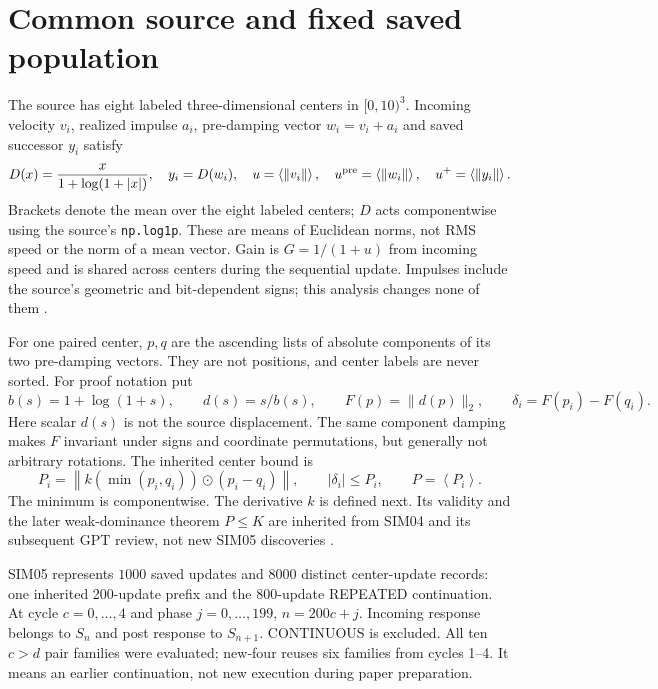 \documentclass[11pt,a4paper]{article}
\newcommand{\avg}[1]{\left\langle #1\right\rangle}
\begin{document}
\clearpage
\section{Common source and fixed saved population}\label{sec:setup}
The source has eight labeled three-dimensional centers in $[0,10)^3$. Incoming velocity $v_i$, realized impulse $a_i$, pre-damping vector $w_i=v_i+a_i$ and saved successor $y_i$ satisfy
\begin{equation}\label{eq:source}
D(x)=\frac{x}{1+\log(1+|x|)},\quad y_i=D(w_i),\quad
u=\avg{\|v_i\|},\quad u^{\rm pre}=\avg{\|w_i\|},\quad u^+=\avg{\|y_i\|}.
\end{equation}
Brackets denote the mean over the eight labeled centers; $D$ acts componentwise using the source's \texttt{np.log1p}. These are means of Euclidean norms, not RMS speed or the norm of a mean vector. Gain is $G=1/(1+u)$ from incoming speed and is shared across centers during the sequential update. Impulses include the source's geometric and bit-dependent signs; this analysis changes none of them \cite{upstream}.

For one paired center, $p,q$ are the ascending lists of absolute components of its two pre-damping vectors. They are not positions, and center labels are never sorted. For proof notation put
\begin{equation}\label{eq:F}
b(s)=1+\log(1+s),\qquad d(s)=s/b(s),\qquad F(p)=\|d(p)\|_2,
\qquad \delta_i=F(p_i)-F(q_i).
\end{equation}
Here scalar $d(s)$ is not the source displacement. The same component damping makes $F$ invariant under signs and coordinate permutations, but generally not arbitrary rotations. The inherited center bound is
\begin{equation}\label{eq:P}
P_i=\left\|k(\min(p_i,q_i))\odot(p_i-q_i)\right\|,\qquad
|\delta_i|\le P_i,\qquad P=\avg{P_i}.
\end{equation}
The minimum is componentwise. The derivative $k$ is defined next. Its validity and the later weak-dominance theorem $P\le K$ are inherited from SIM04 and its subsequent GPT review, not new SIM05 discoveries \cite{dominance}.

SIM05 represents \ensuremath{1000} saved updates and \ensuremath{8000} distinct center-update records: one inherited 200-update prefix and the 800-update REPEATED continuation. At cycle $c=0,\ldots,4$ and phase $j=0,\ldots,199$, $n=200c+j$. Incoming response belongs to $S_n$ and post response to $S_{n+1}$. CONTINUOUS is excluded. All ten $c>d$ pair families were evaluated; new-four reuses six families from cycles 1--4. It means an earlier continuation, not new execution during paper preparation.
\end{document}
